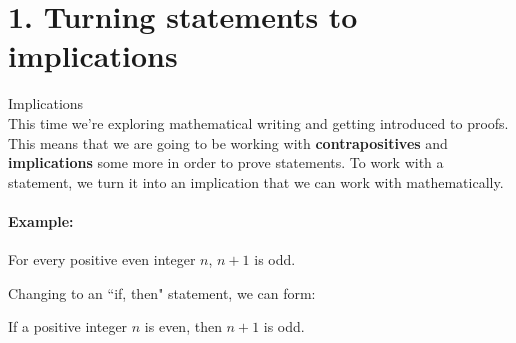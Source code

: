 \documentclass[a4paper,12pt]{book}
\title{}
\author{Rachel Morris}
\date{\today}
\begin{document}
    \togglefalse{answerkey}


    \section*{1. Turning statements to implications}

        \begin{intro}{Implications} ~\\
            This time we're exploring mathematical writing and getting introduced
            to proofs. This means that we are going to be working with
            \textbf{contrapositives} and \textbf{implications} some more
            in order to prove statements.
            To work with a statement, we turn it into an implication that
            we can work with mathematically.

            \paragraph{Example:}
            For every positive even integer $n$, $n+1$ is odd.

            Changing to an ``if, then" statement, we can form:

            If a positive integer $n$ is even, then $n+1$ is odd.
        \end{intro}
\end{document}
